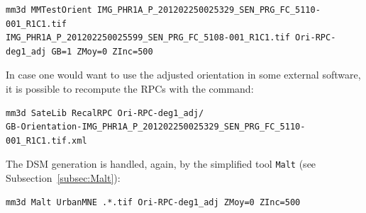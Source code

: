 \begin{verbatim}
mm3d MMTestOrient IMG_PHR1A_P_201202250025329_SEN_PRG_FC_5110-001_R1C1.tif 
IMG_PHR1A_P_201202250025599_SEN_PRG_FC_5108-001_R1C1.tif Ori-RPC-deg1_adj GB=1 ZMoy=0 ZInc=500
\end{verbatim}
%
In case one would want to use the adjusted orientation in some external software, it is possible to recompute the RPCs with the command:
\begin{verbatim}
mm3d SateLib RecalRPC Ori-RPC-deg1_adj/
GB-Orientation-IMG_PHR1A_P_201202250025329_SEN_PRG_FC_5110-001_R1C1.tif.xml
\end{verbatim}
The DSM generation is handled, again, by the simplified tool {\tt Malt} (see Subsection~\ref{subsec:Malt}): 
\begin{verbatim}
mm3d Malt UrbanMNE .*.tif Ori-RPC-deg1_adj ZMoy=0 ZInc=500
\end{verbatim}
%

%
